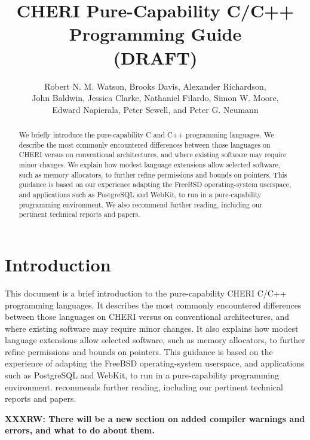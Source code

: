 \documentclass[12pt,twoside,openright,a4paper]{article}
\title{CHERI Pure-Capability C/C++ Programming Guide \\ (DRAFT)}
\author{Robert N. M. Watson, Brooks Davis, Alexander Richardson, \\
  John Baldwin, Jessica Clarke, Nathaniel Filardo, Simon W. Moore, \\
  Edward Napierala, Peter Sewell, and Peter G. Neumann}
\begin{document}
\sloppy

\maketitle


%
%
\begin{abstract}
We briefly introduce the pure-capability C and C++ programming languages.
We describe the most commonly encountered differences between those languages
on CHERI versus on conventional architectures, and where existing software may
require minor changes.
We explain how modest language extensions allow selected software, such
as memory allocators, to further refine permissions and bounds on pointers.
This guidance is based on our experience adapting the FreeBSD operating-system
userspace, and applications such as PostgreSQL and WebKit, to run in a
pure-capability programming environment.
We also recommend further reading, including our pertinent technical reports
and papers.
\end{abstract}

\newpage
\setcounter{tocdepth}{2}
\tableofcontents

\newpage

\section{Introduction}

%
%
This document is a brief introduction to the pure-capability CHERI C/C++
programming languages.
It describes the most commonly encountered differences between those languages
on CHERI versus on conventional architectures, and where existing software may
require minor changes.
It also explains how modest language extensions allow selected software, such
as memory allocators, to further refine permissions and bounds on pointers.
This guidance is based on the experience of adapting the FreeBSD
operating-system userspace, and applications such as PostgreSQL and WebKit, to
run in a pure-capability programming environment.
 recommends further reading, including our
pertinent technical reports and papers.

\textbf{XXXRW: There will be a new section on added compiler warnings and
  errors, and what to do about them.}
\end{document}
